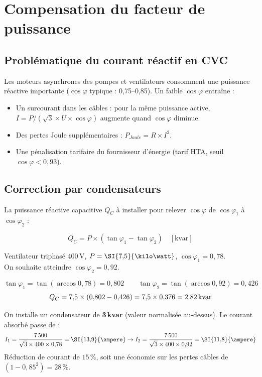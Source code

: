 \section{Compensation du facteur de puissance}

\subsection{Problématique du courant réactif en CVC}

Les moteurs asynchrones des pompes et ventilateurs consomment une puissance réactive importante ($\cos\varphi$ typique : 0,75--0,85). Un faible $\cos\varphi$ entraîne :
\begin{itemize}
  \item Un surcourant dans les câbles : pour la même puissance active, $I = P / (\sqrt{3} \times U \times \cos\varphi)$ augmente quand $\cos\varphi$ diminue.
  \item Des pertes Joule supplémentaires : $P_{Joule} = R \times I^2$.
  \item Une pénalisation tarifaire du fournisseur d'énergie (tarif HTA, seuil $\cos\varphi < 0{,}93$).
\end{itemize}

\subsection{Correction par condensateurs}

La puissance réactive capacitive $Q_C$ à installer pour relever $\cos\varphi$ de $\cos\varphi_1$ à $\cos\varphi_2$ :

\begin{equation}
  Q_C = P \times \left(\tan\varphi_1 - \tan\varphi_2\right) \quad [\text{kvar}]
\end{equation}

\begin{exemple}[title={Compensation du facteur de puissance — ventilateur CTA}]
  Ventilateur triphasé 400\,V, $P = \SI{7{,}5}{\kilo\watt}$, $\cos\varphi_1 = 0{,}78$.\\
  On souhaite atteindre $\cos\varphi_2 = 0{,}92$.

  \[
    \tan\varphi_1 = \tan(\arccos 0{,}78) = 0{,}802 \qquad \tan\varphi_2 = \tan(\arccos 0{,}92) = 0{,}426
  \]
  \[
    Q_C = 7{,}5 \times (0{,}802 - 0{,}426) = 7{,}5 \times 0{,}376 = \SI{2{,}82}{\text{kvar}}
  \]

  On installe un condensateur de \textbf{3\,kvar} (valeur normalisée au-dessus). Le courant absorbé passe de :
  \[
    I_1 = \frac{7\,500}{\sqrt{3} \times 400 \times 0{,}78} = \SI{13{,}9}{\ampere} \rightarrow I_2 = \frac{7\,500}{\sqrt{3} \times 400 \times 0{,}92} = \SI{11{,}8}{\ampere}
  \]
  Réduction de courant de $15\,\%$, soit une économie sur les pertes câbles de $(1 - 0{,}85^2) = 28\,\%$.
\end{exemple}

